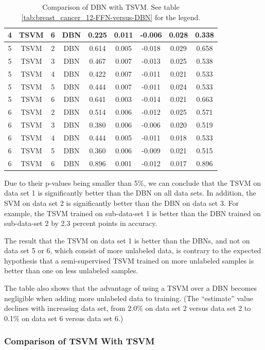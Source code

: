 \begin{table}[p]
\begin{centering}
\begin{tabular}{|c|c|c|c|c|c|c|c|c|}
\hline 
4 & TSVM & 6 & DBN & 0.225 & 0.011 & -0.006 & 0.028 & 0.338\tabularnewline
\hline 
5 & TSVM & 2 & DBN & 0.614 & 0.005 & -0.018 & 0.029 & 0.658\tabularnewline
\hline 
5 & TSVM & 3 & DBN & 0.467 & 0.007 & -0.013 & 0.025 & 0.538\tabularnewline
\hline 
5 & TSVM & 4 & DBN & 0.422 & 0.007 & -0.011 & 0.021 & 0.533\tabularnewline
\hline 
5 & TSVM & 5 & DBN & 0.444 & 0.007 & -0.011 & 0.024 & 0.533\tabularnewline
\hline 
5 & TSVM & 6 & DBN & 0.641 & 0.003 & -0.014 & 0.021 & 0.663\tabularnewline
\hline 
6 & TSVM & 2 & DBN & 0.514 & 0.006 & -0.012 & 0.025 & 0.571\tabularnewline
\hline 
6 & TSVM & 3 & DBN & 0.380 & 0.006 & -0.006 & 0.020 & 0.519\tabularnewline
\hline 
6 & TSVM & 4 & DBN & 0.444 & 0.005 & -0.011 & 0.018 & 0.533\tabularnewline
\hline 
6 & TSVM & 5 & DBN & 0.360 & 0.006 & -0.009 & 0.021 & 0.515\tabularnewline
\hline 
6 & TSVM & 6 & DBN & 0.896 & 0.001 & -0.012 & 0.017 & 0.896\tabularnewline
\hline 
\end{tabular}
\par\end{centering}
\caption[Comparison of DBN with TSVM.]{\label{tab:breast_cancer_12-TSVM-versus-DBN}Comparison of DBN with
TSVM. See table \ref{tab:breast_cancer_12-FFN-versus-DBN} for the
legend.}
\end{table}

Due to their p-values being smaller than 5\%, we can conclude that
the TSVM on data set 1 is significantly better than the DBN on all
data sets. In addition, the SVM on data set 2 is significantly better
than the DBN on data set 3. For example, the TSVM trained on sub-data-set
1 is better than the DBN trained on sub-data-set 2 by 2.3 percent
points in accuracy.

The result that the TSVM on data set 1 is better than the DBNs, and
not on data set 5 or 6, which consist of more unlabeled data, is contrary
to the expected hypothesis that a semi-supervised TSVM trained on
more unlabeled samples is better than one on less unlabeled samples.

The table also shows that the advantage of using a TSVM over a DBN
becomes negligible when adding more unlabeled data to training. (The
``estimate'' value declines with increasing data set, from 2.0\%
on data set 2 versus data set 2 to 0.1\% on data set 6 versus data
set 6.)

\subsubsection{Comparison of TSVM With TSVM}

